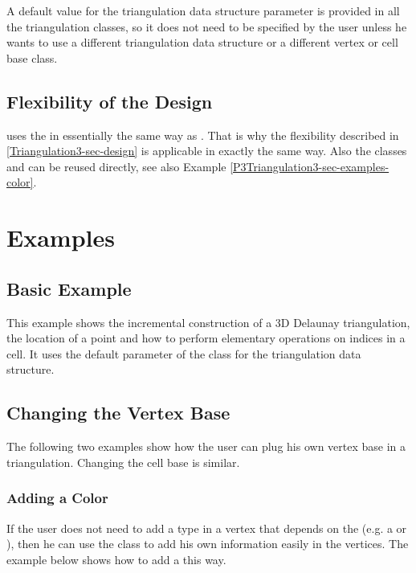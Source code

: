 A default value for the triangulation data structure parameter is provided in
all the triangulation classes, so it does not need to be specified by
the user unless he wants to use a different triangulation data
structure or a different vertex or cell base class.

\subsection{Flexibility of the Design}
 uses the
 in essentially the same way as
. That is why the flexibility described in
\ref{Triangulation3-sec-design} is applicable in exactly the same
way. Also the classes  and
 can be reused directly, see
also Example \ref{P3Triangulation3-sec-examples-color}.

\section{Examples\label{P3Triangulation3-sec-examples}}
\subsection{Basic Example}
This example shows the incremental construction of a 3D Delaunay
triangulation, the location of a point and how to perform elementary
operations on indices in a cell. It uses the default parameter of the
 class for the triangulation
data structure.


\subsection{Changing the Vertex Base}
The following two examples show how the user can plug his own vertex base in a
triangulation.  Changing the cell base is similar.

\subsubsection{Adding a Color\label{P3Triangulation3-sec-examples-color}}
If the user does not need to add a type in a vertex that depends on the
 (e.g. a  or
), then he can use the
 class to add his own information
easily in the vertices.  The example below shows how to add a 
this way.

